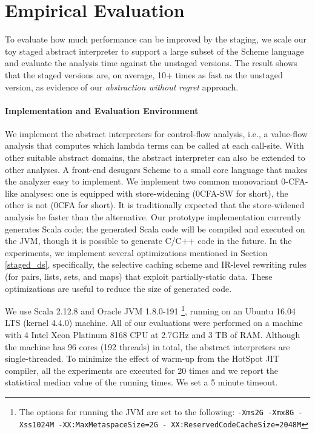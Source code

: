 \section{Empirical Evaluation} \label{evaluation}

To evaluate how much performance can be improved by the staging, we scale our
toy staged abstract interpreter to support a large subset of the Scheme language and evaluate
the analysis time against the unstaged versions. The result shows that the
staged versions are, on average, 10+ times as fast as the unstaged version, as
evidence of our \textit{abstraction without regret} approach.

\vspace{-5pt}
\paragraph{Implementation and Evaluation Environment} We implement the abstract
interpreters for control-flow analysis, i.e., a value-flow analysis that
computes which lambda terms can be called at each call-site.
With other suitable abstract domains, the abstract interpreter
can also be extended to other analyses.
A front-end desugars Scheme to a small core language that makes the analyzer
easy to implement. We implement two common monovariant 0-CFA-like analyses: one
is equipped with store-widening (0CFA-SW for short), the other is not (0CFA
for short). It is traditionally expected that the store-widened analysis be faster than the
alternative.  Our prototype implementation currently generates Scala code; the
generated Scala code will be compiled and executed on the JVM, though it is possible to
generate C/C++ code in the future. In the experiments, we implement several
optimizations mentioned in Section \ref{staged_ds}, specifically, the selective
caching scheme and IR-level rewriting rules (for pairs, lists, sets, and maps)
that exploit partially-static data. These optimizations are useful to reduce
the size of generated code.

We use Scala 2.12.8 and Oracle JVM 1.8.0-191 \footnote{The options for
running the JVM are set to the following: \texttt{-Xms2G -Xmx8G -Xss1024M
-XX:MaxMetaspaceSize=2G - XX:ReservedCodeCacheSize=2048M}},
running on an Ubuntu 16.04 LTS (kernel 4.4.0) machine. All of our
evaluations were performed on a machine with 4 Intel Xeon Platinum
8168 CPU at 2.7GHz and 3 TB of RAM. Although the machine has 96 cores
(192 threads) in total, the abstract interpreters are single-threaded.
To minimize the effect of warm-up from the HotSpot JIT compiler,
all the experiments are executed for 20 times and we report the
statistical median value of the running times. We set a 5 minute
timeout.


